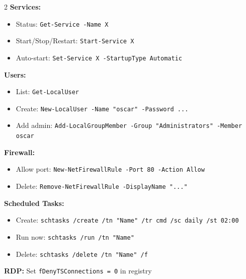 \documentclass[11pt, letterpaper]{article}
\begin{document}
\begin{tcolorbox}[colback=partbg, colframe=sectionblue,
  title={\bfseries Windows PowerShell Setup Quick Reference}, arc=3pt, boxrule=1pt]
\footnotesize
\begin{multicols}{2}
\textbf{Services:}
\begin{itemize}[noitemsep, leftmargin=*]
  \item Status: \texttt{Get-Service -Name X}
  \item Start/Stop/Restart: \texttt{Start-Service X}
  \item Auto-start: \texttt{Set-Service X -StartupType Automatic}
\end{itemize}
\textbf{Users:}
\begin{itemize}[noitemsep, leftmargin=*]
  \item List: \texttt{Get-LocalUser}
  \item Create: \texttt{New-LocalUser -Name "oscar" -Password ...}
  \item Add admin: \texttt{Add-LocalGroupMember -Group "Administrators" -Member oscar}
\end{itemize}
\columnbreak
\textbf{Firewall:}
\begin{itemize}[noitemsep, leftmargin=*]
  \item Allow port: \texttt{New-NetFirewallRule -Port 80 -Action Allow}
  \item Delete: \texttt{Remove-NetFirewallRule -DisplayName "..."}
\end{itemize}
\textbf{Scheduled Tasks:}
\begin{itemize}[noitemsep, leftmargin=*]
  \item Create: \texttt{schtasks /create /tn "Name" /tr cmd /sc daily /st 02:00}
  \item Run now: \texttt{schtasks /run /tn "Name"}
  \item Delete: \texttt{schtasks /delete /tn "Name" /f}
\end{itemize}
\textbf{RDP:} Set \texttt{fDenyTSConnections = 0} in registry
\end{multicols}
\end{tcolorbox}

\vspace{4pt}
\end{document}

